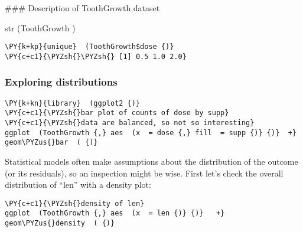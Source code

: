 
### Description of ToothGrowth dataset



str  (ToothGrowth {)}


    \begin{tcolorbox}[breakable, size=fbox, boxrule=1pt, pad at break*=1mm,colback=cellbackground, colframe=cellborder]
\begin{Verbatim}[commandchars=\\\{\}]
\PY{k+kp}{unique}  (ToothGrowth$dose {)}
\PY{c+c1}{\PYZsh{}\PYZsh{} [1] 0.5 1.0 2.0}
\end{Verbatim}
\end{tcolorbox}



\subsubsection{Exploring distributions}\label{exploring-distributions}

    \begin{tcolorbox}[breakable, size=fbox, boxrule=1pt, pad at break*=1mm,colback=cellbackground, colframe=cellborder]
\begin{Verbatim}[commandchars=\\\{\}]
\PY{k+kn}{library}  (ggplot2 {)}
\PY{c+c1}{\PYZsh{}bar plot of counts of dose by supp}
\PY{c+c1}{\PYZsh{}data are balanced, so not so interesting}
ggplot  (ToothGrowth {,} aes  (x  = dose {,} fill  = supp {)} {)}  +}  geom\PYZus{}bar  ( {)}
\end{Verbatim}
\end{tcolorbox}


    Statistical models often make assumptions about the distribution of the
outcome (or its residuals), so an inspection might be wise. First let's
check the overall distribution of ``len'' with a density plot:

    \begin{tcolorbox}[breakable, size=fbox, boxrule=1pt, pad at break*=1mm,colback=cellbackground, colframe=cellborder]
\begin{Verbatim}[commandchars=\\\{\}]
\PY{c+c1}{\PYZsh{}density of len}
ggplot  (ToothGrowth {,} aes  (x  = len {)} {)}   +} geom\PYZus{}density  ( {)}
\end{Verbatim}
\end{tcolorbox}

